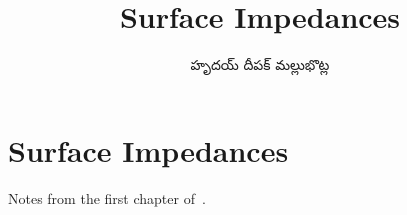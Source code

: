 \documentclass[../main.tex]{subfiles}
\title{Surface Impedances}
\author{\begin{telugu}హృదయ్ దీపక్ మల్లుభొట్ల\end{telugu}}
\date{}
\begin{document}
	\onlyinsubfile{\maketitle}
	\section{Surface Impedances} \label{sec:SurfaceImpedances}

	Notes from the first chapter of~\cite{GarciaMoliner}.
\end{document}
